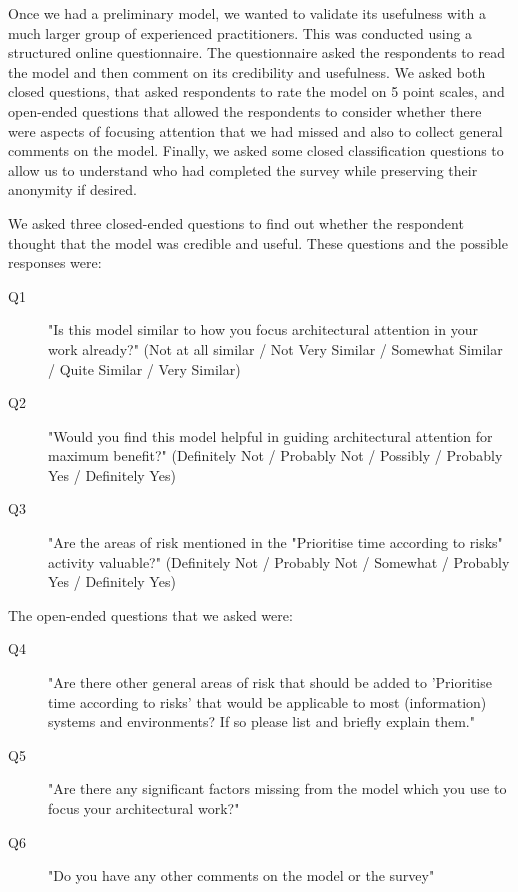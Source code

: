 Once we had a preliminary model, we wanted to validate its usefulness with a much larger group of experienced practitioners.  This was conducted using a structured online questionnaire.  The questionnaire asked the respondents to read the model and then comment on its credibility and usefulness.  We asked both closed questions, that asked respondents to rate the model on 5 point scales, and open-ended questions that allowed the respondents to consider whether there were aspects of focusing attention that we had missed and also to collect general comments on the model.  Finally, we asked some closed classification questions to allow us to understand who had completed the survey while preserving their anonymity if desired.

We asked three closed-ended questions to find out whether the respondent thought that the model was credible and useful.  These questions and the possible responses were:

\begin{description}
	\item [Q1] "Is this model similar to how you focus architectural attention in your work already?" (Not at all similar / Not Very Similar / Somewhat Similar / Quite Similar / Very Similar)
	\item [Q2] "Would you find this model helpful in guiding architectural attention for maximum benefit?" (Definitely Not / Probably Not / Possibly / Probably Yes / Definitely Yes)
	\item [Q3] "Are the areas of risk mentioned in the "Prioritise time according to risks" activity valuable?" (Definitely Not / Probably Not / Somewhat / Probably Yes / Definitely Yes)
\end{description}

The open-ended questions that we asked were:

\begin{description}
	\item [Q4] "Are there other general areas of risk that should be added to 'Prioritise time according to risks' that would be applicable to most (information) systems and environments? If so please list and briefly explain them."
	\item [Q5] "Are there any significant factors missing from the model which you use to focus your architectural work?"
	\item [Q6] "Do you have any other comments on the  model or the survey"
\end{description}

